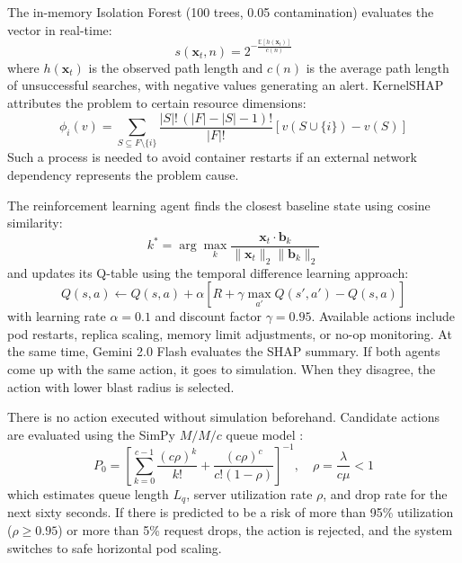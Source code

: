 \documentclass[10pt,conference]{IEEEtran}
\begin{document}
The in-memory Isolation Forest (100 trees, 0.05 contamination) evaluates the vector in real-time:
\begin{equation}
s(\mathbf{x}_t, n) = 2^{-\frac{\mathbb{E}[h(\mathbf{x}_t)]}{c(n)}}
\label{eq:isoforest}
\end{equation}
where $h(\mathbf{x}_t)$ is the observed path length and $c(n)$ is the average path length of unsuccessful searches, with negative values generating an alert. KernelSHAP attributes the problem to certain resource dimensions:
\begin{equation}
\phi_i(v) = \sum_{S \subseteq F \setminus \{i\}} \frac{|S|!\,(|F|-|S|-1)!}{|F|!}\left[v(S \cup \{i\}) - v(S)\right]
\label{eq:shap}
\end{equation}
Such a process is needed to avoid container restarts if an external network dependency represents the problem cause.

The reinforcement learning agent finds the closest baseline state using cosine similarity:
\begin{equation}
k^* = \arg\max_k \frac{\mathbf{x}_t \cdot \mathbf{b}_k}{\|\mathbf{x}_t\|_2 \|\mathbf{b}_k\|_2}
\label{eq:cosine}
\end{equation}
and updates its Q-table using the temporal difference learning approach:
\begin{equation}
Q(s,a) \leftarrow Q(s,a) + \alpha\left[R + \gamma \max_{a'} Q(s',a') - Q(s,a)\right]
\label{eq:qlearn}
\end{equation}
with learning rate $\alpha=0.1$ and discount factor $\gamma=0.95$. Available actions include pod restarts, replica scaling, memory limit adjustments, or no-op monitoring. At the same time, Gemini 2.0 Flash evaluates the SHAP summary. If both agents come up with the same action, it goes to simulation. When they disagree, the action with lower blast radius is selected.

There is no action executed without simulation beforehand. Candidate actions are evaluated using the SimPy $M/M/c$ queue model \cite{queueing}:
\begin{equation}
P_0 = \left[ \sum_{k=0}^{c-1} \frac{(c\rho)^k}{k!} + \frac{(c\rho)^c}{c!(1-\rho)} \right]^{-1}, \quad \rho = \frac{\lambda}{c\mu} < 1
\label{eq:mmc}
\end{equation}
which estimates queue length $L_q$, server utilization rate $\rho$, and drop rate for the next sixty seconds. If there is predicted to be a risk of more than 95\% utilization ($\rho \geq 0.95$) or more than 5\% request drops, the action is rejected, and the system switches to safe horizontal pod scaling.
\end{document}
